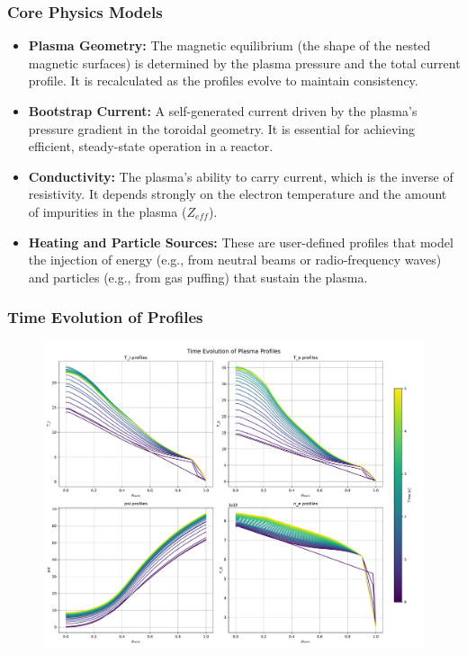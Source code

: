 \documentclass[10pt,aspectratio=169]{beamer}
\begin{document}
\begin{frame}
  \frametitle{Core Physics Models}
  \begin{itemize}
    \item \textbf{Plasma Geometry:} The magnetic equilibrium (the shape of the nested magnetic surfaces) is determined by the plasma pressure and the total current profile. It is recalculated as the profiles evolve to maintain consistency.
    \item \textbf{Bootstrap Current:} A self-generated current driven by the plasma's pressure gradient in the toroidal geometry. It is essential for achieving efficient, steady-state operation in a reactor.
    \item \textbf{Conductivity:} The plasma's ability to carry current, which is the inverse of resistivity. It depends strongly on the electron temperature and the amount of impurities in the plasma ($Z_{eff}$).
    \item \textbf{Heating and Particle Sources:} These are user-defined profiles that model the injection of energy (e.g., from neutral beams or radio-frequency waves) and particles (e.g., from gas puffing) that sustain the plasma.
  \end{itemize}
\end{frame}

\begin{frame}
  \frametitle{Time Evolution of Profiles}
  \begin{figure}
    \includegraphics[width=\textwidth]{all_profiles.pdf}
  \end{figure}
\end{frame}

\begin{frame}[allowframebreaks]
  
  
  \nocite{*}
\end{frame}
\end{document}
